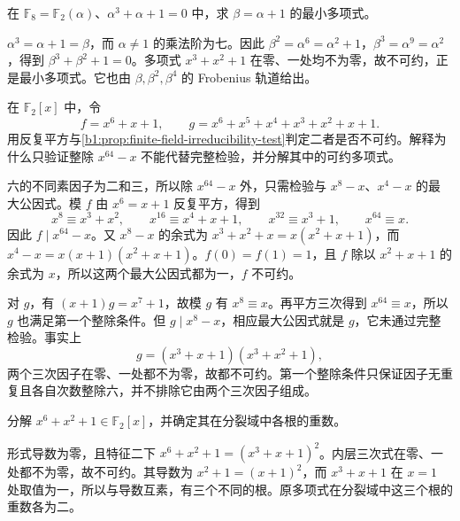 \begin{exercise}\label{b1:ex:17-minimal-shift}
	在 \(\mathbb F_8=\mathbb F_2(\alpha)\)、\(\alpha^3+\alpha+1=0\) 中，求 \(\beta=\alpha+1\) 的最小多项式。
\end{exercise}
\begin{solution}
	\(\alpha^3=\alpha+1=\beta\)，而 \(\alpha\ne1\) 的乘法阶为七。因此 \(\beta^2=\alpha^6=\alpha^2+1\)，\(\beta^3=\alpha^9=\alpha^2\)，得到 \(\beta^3+\beta^2+1=0\)。多项式 \(x^3+x^2+1\) 在零、一处均不为零，故不可约，正是最小多项式。它也由 \(\beta,\beta^2,\beta^4\) 的 Frobenius 轨道给出。
\end{solution}

\begin{exercise}\label{b1:ex:17-irreducibility-test}
	在 \(\mathbb F_2[x]\) 中，令
	\[
		f=x^6+x+1,\qquad g=x^6+x^5+x^4+x^3+x^2+x+1.
	\]
	用反复平方与\cref{b1:prop:finite-field-irreducibility-test}判定二者是否不可约。解释为什么只验证整除 \(x^{64}-x\) 不能代替完整检验，并分解其中的可约多项式。
\end{exercise}
\begin{solution}
	六的不同素因子为二和三，所以除 \(x^{64}-x\) 外，只需检验与 \(x^8-x\)、\(x^4-x\) 的最大公因式。模 \(f\) 由 \(x^6=x+1\) 反复平方，得到
	\[
		x^8\equiv x^3+x^2,\qquad x^{16}\equiv x^4+x+1,\qquad x^{32}\equiv x^3+1,\qquad x^{64}\equiv x.
	\]
	因此 \(f\mid x^{64}-x\)。又 \(x^8-x\) 的余式为 \(x^3+x^2+x=x(x^2+x+1)\)，而 \(x^4-x=x(x+1)(x^2+x+1)\)。\(f(0)=f(1)=1\)，且 \(f\) 除以 \(x^2+x+1\) 的余式为 \(x\)，所以这两个最大公因式都为一，\(f\) 不可约。

	对 \(g\)，有 \((x+1)g=x^7+1\)，故模 \(g\) 有 \(x^8\equiv x\)。再平方三次得到 \(x^{64}\equiv x\)，所以 \(g\) 也满足第一个整除条件。但 \(g\mid x^8-x\)，相应最大公因式就是 \(g\)，它未通过完整检验。事实上
	\[
		g=(x^3+x+1)(x^3+x^2+1),
	\]
	两个三次因子在零、一处都不为零，故都不可约。第一个整除条件只保证因子无重复且各自次数整除六，并不排除它由两个三次因子组成。
\end{solution}

\begin{exercise}\label{b1:ex:17-inseparable-factor}
	分解 \(x^6+x^2+1\in\mathbb F_2[x]\)，并确定其在分裂域中各根的重数。
\end{exercise}
\begin{solution}
	形式导数为零，且特征二下 \(x^6+x^2+1=(x^3+x+1)^2\)。内层三次式在零、一处都不为零，故不可约。其导数为 \(x^2+1=(x+1)^2\)，而 \(x^3+x+1\) 在 \(x=1\) 处取值为一，所以与导数互素，有三个不同的根。原多项式在分裂域中这三个根的重数各为二。
\end{solution}

